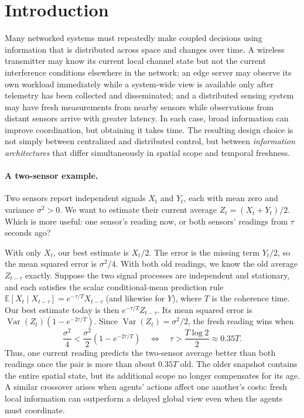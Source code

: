 \documentclass[11pt]{article}
\begin{document}
\section{Introduction}
\label{sec:introduction}

Many networked systems must repeatedly make coupled decisions using information
that is distributed across space and changes over time. A wireless transmitter
may know its current local channel state but not the current interference
conditions elsewhere in the network; an edge server may observe its own
workload immediately while a system-wide view is available only after telemetry
has been collected and disseminated; and a distributed sensing system may have
fresh measurements from nearby sensors while observations from distant sensors
arrive with greater latency. In each case, broad information can improve
coordination, but obtaining it takes time. The resulting design choice is not
simply between centralized and distributed control, but between
\emph{information architectures} that differ simultaneously in spatial scope
and temporal freshness.

\paragraph*{A two-sensor example.}
Two sensors report independent signals $X_t$ and $Y_t$, each with mean zero
and variance $\sigma^2>0$. We want to estimate their current average
$Z_t=(X_t+Y_t)/2$. Which is more useful: one sensor's reading now, or both
sensors' readings from $\tau$ seconds ago?

With only $X_t$, our best estimate is $X_t/2$. The error is the missing term
$Y_t/2$, so the mean squared error is $\sigma^2/4$. With both old readings,
we know the old average $Z_{t-\tau}$ exactly. Suppose the two signal processes are independent and stationary, and each
satisfies the scalar conditional-mean prediction rule
$\mathbb E[X_t\mid X_{t-\tau}]=e^{-\tau/T}X_{t-\tau}$ (and likewise
for $Y$), where $T$ is the coherence time. Our best estimate today is then $e^{-\tau/T}Z_{t-\tau}$.
Its mean squared error is
$\operatorname{Var}(Z_t)(1-e^{-2\tau/T})$. Since
$\operatorname{Var}(Z_t)=\sigma^2/2$, the fresh reading wins when
\[
    \frac{\sigma^2}{4}
    <\frac{\sigma^2}{2}(1-e^{-2\tau/T})
    \quad\Longleftrightarrow\quad
    \tau>\frac{T\log 2}{2}\approx 0.35T.
\]
Thus, one current reading predicts the two-sensor average better than both
readings once the pair is more than about $0.35T$ old. The older snapshot
contains the entire spatial state, but its additional scope no longer
compensates for its age. A similar crossover arises when agents' actions
affect one another's costs: fresh local information can outperform a
delayed global view even when the agents must coordinate.
\end{document}
